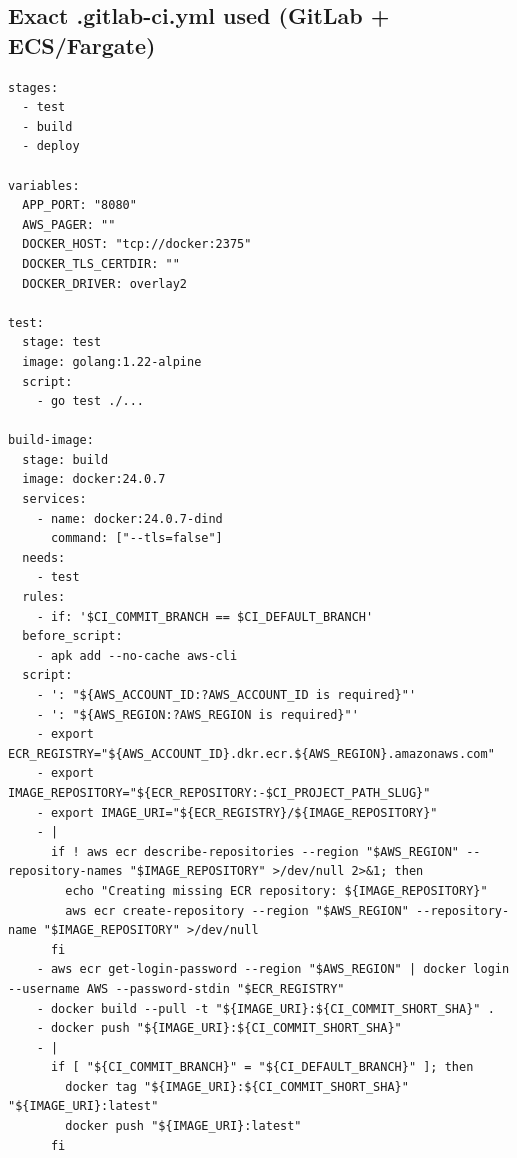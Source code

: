 \documentclass{article}
\begin{document}
\subsection{Exact .gitlab-ci.yml used (GitLab + ECS/Fargate)}
\begin{lstlisting}
stages:
  - test
  - build
  - deploy

variables:
  APP_PORT: "8080"
  AWS_PAGER: ""
  DOCKER_HOST: "tcp://docker:2375"
  DOCKER_TLS_CERTDIR: ""
  DOCKER_DRIVER: overlay2

test:
  stage: test
  image: golang:1.22-alpine
  script:
    - go test ./...

build-image:
  stage: build
  image: docker:24.0.7
  services:
    - name: docker:24.0.7-dind
      command: ["--tls=false"]
  needs:
    - test
  rules:
    - if: '$CI_COMMIT_BRANCH == $CI_DEFAULT_BRANCH'
  before_script:
    - apk add --no-cache aws-cli
  script:
    - ': "${AWS_ACCOUNT_ID:?AWS_ACCOUNT_ID is required}"'
    - ': "${AWS_REGION:?AWS_REGION is required}"'
    - export ECR_REGISTRY="${AWS_ACCOUNT_ID}.dkr.ecr.${AWS_REGION}.amazonaws.com"
    - export IMAGE_REPOSITORY="${ECR_REPOSITORY:-$CI_PROJECT_PATH_SLUG}"
    - export IMAGE_URI="${ECR_REGISTRY}/${IMAGE_REPOSITORY}"
    - |
      if ! aws ecr describe-repositories --region "$AWS_REGION" --repository-names "$IMAGE_REPOSITORY" >/dev/null 2>&1; then
        echo "Creating missing ECR repository: ${IMAGE_REPOSITORY}"
        aws ecr create-repository --region "$AWS_REGION" --repository-name "$IMAGE_REPOSITORY" >/dev/null
      fi
    - aws ecr get-login-password --region "$AWS_REGION" | docker login --username AWS --password-stdin "$ECR_REGISTRY"
    - docker build --pull -t "${IMAGE_URI}:${CI_COMMIT_SHORT_SHA}" .
    - docker push "${IMAGE_URI}:${CI_COMMIT_SHORT_SHA}"
    - |
      if [ "${CI_COMMIT_BRANCH}" = "${CI_DEFAULT_BRANCH}" ]; then
        docker tag "${IMAGE_URI}:${CI_COMMIT_SHORT_SHA}" "${IMAGE_URI}:latest"
        docker push "${IMAGE_URI}:latest"
      fi


\end{lstlisting}
\end{document}
